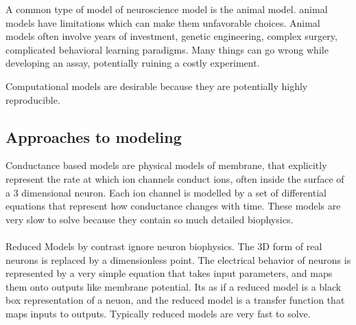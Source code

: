 A common type of model of neuroscience model is the animal model. animal models have limitations which can make them unfavorable choices. Animal models often involve years of investment, genetic engineering, complex surgery, complicated behavioral learning paradigms. Many things can go wrong while developing an assay, potentially ruining a costly experiment. 

Computational models are desirable because they are potentially highly reproducible.


\subsection{Approaches to modeling}
Conductance based models are physical models of membrane, that explicitly represent the rate at which ion channels conduct ions, often inside the surface of a 3 dimensional neuron. Each ion channel is modelled by a set of differential equations that represent how conductance changes with time. These models are very slow to solve because they contain so much detailed biophysics. \\
\\
Reduced Models by contrast ignore neuron biophysics. The 3D form of real neurons is replaced by a dimensionless point. The electrical behavior of neurons is represented by a very simple equation that takes input parameters, and maps them onto outputs like membrane potential. Its as if a reduced model is a black box representation of a neuon, and the reduced model is a transfer function that maps inputs to outputs. Typically reduced models are very fast to solve.\\
\\

